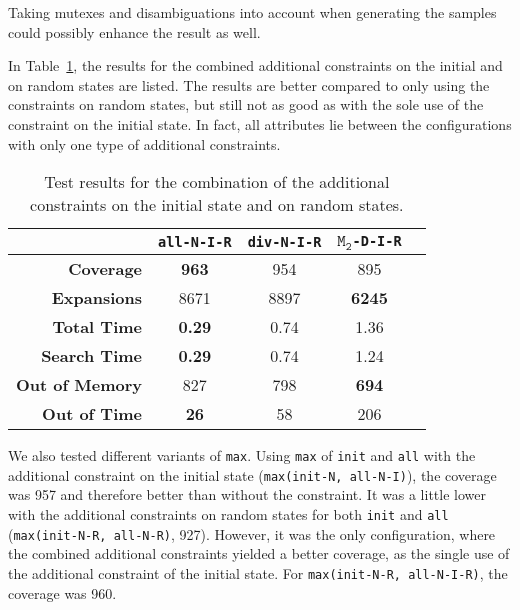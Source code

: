 Taking mutexes and disambiguations into account when generating the samples could possibly enhance the result as well.

In Table~\ref{table:initial-random-samples-constraint}, the results for the combined additional constraints on the initial and on random states are listed.
The results are better compared to only using the constraints on random states, but still not as good as with the sole use of the constraint on the initial state.
In fact, all attributes lie between the configurations with only one type of additional constraints.

\begin{table}[h!]
    \begin{center}
        \begin{tabular}{|r|c|c|c|c|}
            \hline
            & \textbf{\texttt{all-N-I-R}} & \textbf{\texttt{div-N-I-R}} & \textbf{$\texttt{M}_\texttt{2}$\texttt{-D-I-R}} \\
            \hline \hline
            \textbf{Coverage}       & \textbf{963}  & 954  & 895   \\ \hline
            \textbf{Expansions}     & 8671          & 8897 & \textbf{6245}   \\ \hline
            \textbf{Total Time}     & \textbf{0.29} & 0.74 & 1.36  \\ \hline
            \textbf{Search Time}    & \textbf{0.29} & 0.74 & 1.24  \\ \hline
            \textbf{Out of Memory}  & 827           & 798  & \textbf{694}   \\ \hline
            \textbf{Out of Time}    & \textbf{26}   & 58   & 206   \\ \hline
        \end{tabular}
        \caption{ Test results for the combination of the additional constraints on the initial state and on random states.}
        \label{table:initial-random-samples-constraint}
    \end{center}
\end{table}

We also tested different variants of \texttt{max}.
Using \texttt{max} of \texttt{init} and \texttt{all} with the additional constraint on the initial state (\texttt{max(init-N, all-N-I)}), the coverage was 957 and therefore better than without the constraint.
It was a little lower with the additional constraints on random states for both \texttt{init} and \texttt{all} (\texttt{max(init-N-R, all-N-R)}, 927).
However, it was the only configuration, where the combined additional constraints yielded a better coverage, as the single use of the additional constraint of the initial state.
For \texttt{max(init-N-R, all-N-I-R)}, the coverage was 960.
\newpage

